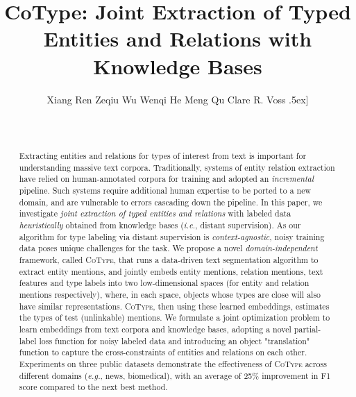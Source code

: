 \documentclass[letterpaper]{sig-alternate-2013}
\def\ie{{\sl i.e.}}
\def\eg{{\sl e.g.}}
\begin{document}
\title{CoType: Joint Extraction of Typed Entities and Relations with Knowledge Bases}

\author{
\alignauthor
 Xiang Ren Zeqiu Wu Wenqi He Meng Qu   Clare R. Voss \0.5ex]
\\
\\
\\
}

\maketitle

\begin{abstract}
Extracting entities and relations for types of interest from text is important for understanding massive text corpora. Traditionally, systems of entity relation extraction have relied on human-annotated corpora for training and adopted an \textit{incremental} pipeline. Such systems require additional human expertise to be ported to a new domain, and are vulnerable to errors cascading down the pipeline. In this paper, we investigate \textit{joint extraction of typed entities and relations} with labeled data \textit{heuristically} obtained from knowledge bases (\ie, distant supervision). As our algorithm for type labeling via distant supervision is \textit{context-agnostic}, noisy training data poses unique challenges for the task. We propose a novel \textit{domain-independent} framework, called \textsc{CoType}, that runs a data-driven text segmentation algorithm to extract entity mentions, and jointly embeds entity mentions, relation mentions, text features and type labels into two low-dimensional spaces (for entity and relation mentions respectively), where, in each space, objects whose types are close will also have similar representations. \textsc{CoType}, then using these learned embeddings, estimates the types of test (unlinkable) mentions. We formulate a joint optimization problem to learn embeddings from text corpora and knowledge bases, adopting a novel partial-label loss function for noisy labeled data and introducing an object "translation" function to capture the cross-constraints of entities and relations on each other. Experiments on three public datasets demonstrate the effectiveness  of \textsc{CoType} across different domains (\eg, news, biomedical), with an average of 25\% improvement in F1 score compared to the next best method.
\end{abstract}
\end{document}
